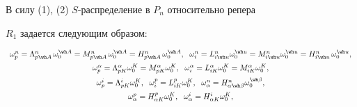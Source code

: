 В силу (1), (2) $S$-распределение в $P_n$ относительно репера


$R_1$ задается следующим образом:


\begin{equation}


\begin{array}{c}


\omega^n_p=\Lambda^n_{p \wh A}\,\omega^{\wh A}_0=


M^n_{p \wh A}\,\omega^{\wh A}_0=H^n_{p \wh A}\,\omega^{\wh A}_0,\ \;


\omega^n_i=L^n_{i \wh u}\omega^{\wh u}_0=


M^n_{i \wh u}\omega^{\wh u}_0=H^n_{i \wh u}\,\omega^{\wh u}_0, \\[2mm]


\omega^\alpha_p=\Lambda^\alpha_{p K}\omega^K_0=


M^\alpha_{p K}\omega^K_0,\ \;


\omega^\alpha_i=L^\alpha_{i K}\omega^K_0=


M^\alpha_{i K}\omega^K_0, \\[2mm]


\omega^i_p=\Lambda^i_{p K}\omega^K_0,\ \;


\omega^p_i=L^p_{i K}\omega^K_0,\ \;


\omega^n_\alpha=H^n_{\alpha \wh\beta}\omega^{\wh\beta}_0, \\[2mm]


\omega^p_\alpha=H^p_{\alpha K}\omega^K_0,\ \;


\omega^i_\alpha=H^i_{\alpha K}\omega^K_0, 


\end{array}


\end{equation}


